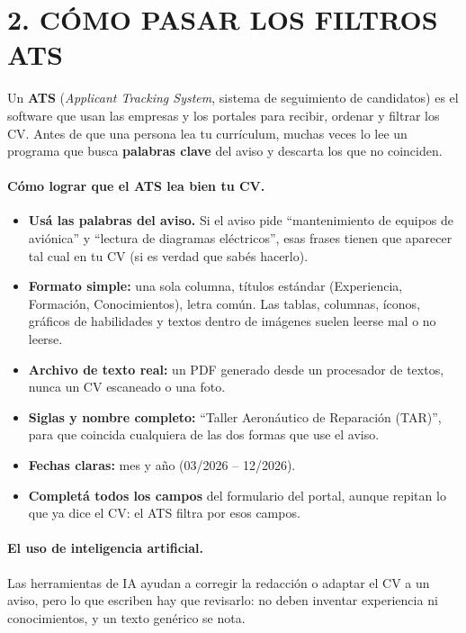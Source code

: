 \section*{2. CÓMO PASAR LOS FILTROS ATS}

\begin{recuadro}
Un \textbf{ATS} (\textit{Applicant Tracking System}, sistema de seguimiento de candidatos) es
el software que usan las empresas y los portales para recibir, ordenar y filtrar los CV.
Antes de que una persona lea tu currículum, muchas veces lo lee un programa que busca
\textbf{palabras clave} del aviso y descarta los que no coinciden.
\end{recuadro}

\paragraph*{Cómo lograr que el ATS lea bien tu CV.}
\begin{itemize}
  \item \textbf{Usá las palabras del aviso.} Si el aviso pide ``mantenimiento de equipos de
        aviónica'' y ``lectura de diagramas eléctricos'', esas frases tienen que aparecer tal
        cual en tu CV (si es verdad que sabés hacerlo).
  \item \textbf{Formato simple:} una sola columna, títulos estándar (Experiencia, Formación,
        Conocimientos), letra común. Las tablas, columnas, íconos, gráficos de habilidades y
        textos dentro de imágenes suelen leerse mal o no leerse.
  \item \textbf{Archivo de texto real:} un PDF generado desde un procesador de textos, nunca
        un CV escaneado o una foto.
  \item \textbf{Siglas y nombre completo:} ``Taller Aeronáutico de Reparación (TAR)'', para que
        coincida cualquiera de las dos formas que use el aviso.
  \item \textbf{Fechas claras:} mes y año (03/2026 -- 12/2026).
  \item \textbf{Completá todos los campos} del formulario del portal, aunque repitan lo que ya
        dice el CV: el ATS filtra por esos campos.
\end{itemize}

\paragraph*{El uso de inteligencia artificial.}
Las herramientas de IA ayudan a corregir la redacción o adaptar el CV a un aviso, pero lo
que escriben hay que revisarlo: no deben inventar experiencia ni conocimientos, y un texto
genérico se nota.

